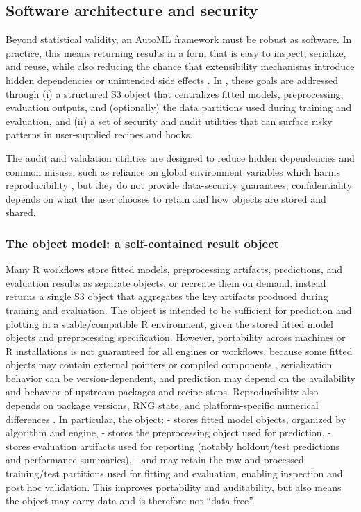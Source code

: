 \subsection{Software architecture and security}\label{sec:software-architecture-and-security}

Beyond statistical validity, an AutoML framework must be robust as software. In practice, this means returning results in a form that is easy to inspect, serialize, and reuse, while also reducing the chance that extensibility mechanisms introduce hidden dependencies or unintended side effects \citep{Wilson:2014aa}. In , these goals are addressed through (i) a structured S3 object \citep{Wickham:2019aa} that centralizes fitted models, preprocessing, evaluation outputs, and (optionally) the data partitions used during training and evaluation, and (ii) a set of security and audit utilities that can surface risky patterns in user-supplied recipes and hooks.

The audit and validation utilities are designed to reduce hidden dependencies and common misuse, such as reliance on global environment variables which harms reproducibility \citep{Peng:2011aa}, but they do not provide data-security guarantees; confidentiality depends on what the user chooses to retain and how objects are stored and shared.

\subsubsection{The object model: a self-contained result object}\label{the-object-model-a-self-contained-result-object}

Many R workflows store fitted models, preprocessing artifacts, predictions, and evaluation results as separate objects, or recreate them on demand.  instead returns a single S3 object that aggregates the key artifacts produced during training and evaluation. The object is intended to be sufficient for prediction and plotting in a stable/compatible R environment, given the stored fitted model objects and preprocessing specification. However, portability across machines or R installations is not guaranteed for all engines or workflows, because some fitted objects may contain external pointers or compiled components \citep{Eddelbuettel:2013}, serialization behavior can be version-dependent, and prediction may depend on the availability and behavior of upstream packages and recipe steps. Reproducibility also depends on package versions, RNG state, and platform-specific numerical differences \citep{Stodden:2014aa}. In particular, the  object:
- stores fitted model objects, organized by algorithm and engine,
- stores the preprocessing object used for prediction,
- stores evaluation artifacts used for reporting (notably holdout/test predictions and performance summaries),
- and may retain the raw and processed training/test partitions used for fitting and evaluation, enabling inspection and post hoc validation. This improves portability and auditability, but also means the object may carry data and is therefore not ``data-free''.

